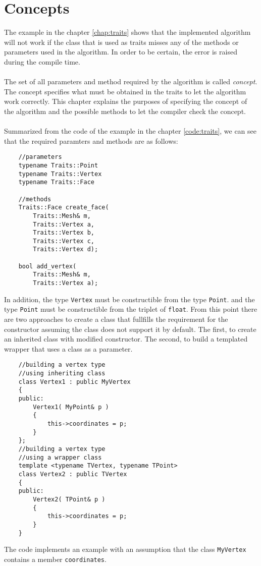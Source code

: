 \chapter{Concepts}

The example in the chapter \ref{chap:traits} shows that the implemented algorithm
will not work if the class that is used as traits misses any of the methods or parameters
used in the algorithm. In order to be certain, the error is raised during the compile time.\\
\\
The set of all parameters and method required by the algorithm is called \emph{concept}.
The concept specifies what must be obtained in the traits to let the algorithm work correctly.
This chapter explains the purposes of specifying the concept of the algorithm and the
possible methods to let the compiler check the concept.\\
\\
Summarized from the code of the example in the chapter \ref{code:traits}, we can see that the required
paramters and methods are as follows:

\begin{lstlisting}
	//parameters
	typename Traits::Point
	typename Traits::Vertex
	typename Traits::Face
	
	//methods
	Traits::Face create_face(
		Traits::Mesh& m,
		Traits::Vertex a,
		Traits::Vertex b,
		Traits::Vertex c,
		Traits::Vertex d);

	bool add_vertex(
		Traits::Mesh& m,
		Traits::Vertex a);
\end{lstlisting}
In addition, the type \texttt{Vertex} must be constructible from the type \texttt{Point}.
and the type \texttt{Point} must be constructible from the triplet of \texttt{float}.
From this point there are two approaches to create a class that fullfills the requirement
for the constructor assuming the class does not support it by default.
The first, to create an inherited class with modified constructor. The second,
to build a templated wrapper that uses a class as a parameter.
\label{code:constr1}
\begin{lstlisting}
	//building a vertex type
	//using inheriting class
	class Vertex1 : public MyVertex
	{
	public:
		Vertex1( MyPoint& p )
		{
			this->coordinates = p;
		}
	};
	//building a vertex type
	//using a wrapper class
	template <typename TVertex, typename TPoint>
	class Vertex2 : public TVertex
	{
	public:
		Vertex2( TPoint& p )
		{
			this->coordinates = p;
		}
	}
\end{lstlisting}
The code implements an example with an assumption that the class \texttt{MyVertex}
contains a member \texttt{coordinates}.

